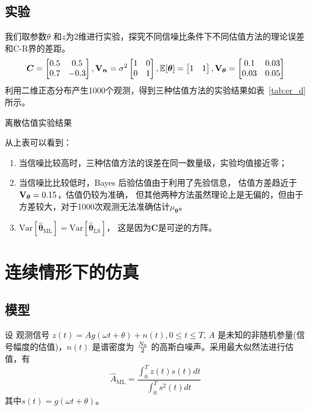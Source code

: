 \documentclass{ctexart}
\def\E{\mathbb{E}}
\def\Var{\textrm{Var}}
\begin{document}
\subsection{实验}
我们取参数$\theta$ 和$z$为2维进行实验，探究不同信噪比条件下不同估值方法的理论误差和C-R界的差距。
$$
\bm{C} = \begin{bmatrix} 0.5 & 0.5 \\ 0.7 & -0.3\end{bmatrix},
\Cov[\bm{n}] = \sigma^2 \begin{bmatrix} 1 & 0 \\ 0 & 1 \end{bmatrix} ,
\E[\bm{\theta}] =\begin{bmatrix} 1 & 1\end{bmatrix},
\Cov[\bm{\theta}] = \begin{bmatrix} 0.1 & 0.03 \\ 0.03 & 0.05 \end{bmatrix}
$$
利用二维正态分布产生1000个观测，得到三种估值方法的实验结果如表~\ref{tab:er_d}所示。
\begin{table}[!ht]
    \centering
    \caption{离散估值实验结果}\label{tab:er_d}
    
\end{table}

从上表可以看到：
\begin{enumerate}
\item 当信噪比较高时，三种估值方法的误差在同一数量级，实验均值接近零；
\item 当信噪比比较低时，Bayes 后验估值由于利用了先验信息， 估值方差趋近于 $\Cov[\bm{\theta}]=0.15$，估值仍较为准确，
但其他两种方法虽然理论上是无偏的，但由于方差较大，对于1000次观测无法准确估计$\mu_{\bm{\theta}}$。
\item $\Var[\hat{\bm{\theta}}_{\textrm{ML}}] = \Var[\hat{\bm{\theta}}_{\textrm{LS}}]$， 这是因为$\bm{C}$是可逆的方阵。
\end{enumerate}

\section{连续情形下的仿真}
\subsection{模型}
设 观测信号 $z(t) = A g(\omega t + \theta) + n(t), 0\leq t \leq T$, $A$ 是未知的非随机参量(信号幅度的估值)，$n(t)$ 是谱密度为 ${N_0 \over 2}$
的高斯白噪声。采用最大似然法进行估值，有 
    \begin{equation}\label{eq:A}
    \hat{A}_{\textrm{ML}} = \frac{\int_0^T z(t)s(t)dt}{\int_0^T s^2(t)dt}
    \end{equation}
其中$ s(t) = g(\omega t + \theta) $。
\end{document}
